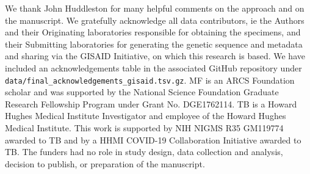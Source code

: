 \documentclass[10pt,letterpaper]{article}
\begin{document}
We thank John Huddleston for many helpful comments on the approach and on the manuscript.
We gratefully acknowledge all data contributors, ie the Authors and their Originating laboratories responsible for obtaining the specimens, and their Submitting laboratories for generating the genetic sequence and metadata and sharing via the GISAID Initiative, on which this research is based.
We have included an acknowledgements table in the associated GitHub repository under \texttt{data/final\_acknowledgements\_gisaid.tsv.gz}.
MF is an ARCS Foundation scholar and was supported by the National Science Foundation Graduate Research Fellowship Program under Grant No. DGE1762114.
TB is a Howard Hughes Medical Institute Investigator and employee of the Howard Hughes Medical Institute.
This work is supported by NIH NIGMS R35 GM119774 awarded to TB and by a HHMI COVID-19 Collaboration Initiative awarded to TB.
The funders had no role in study design, data collection and analysis, decision to publish, or preparation of the manuscript.


\nolinenumbers

%
%
%

%
\end{document}
